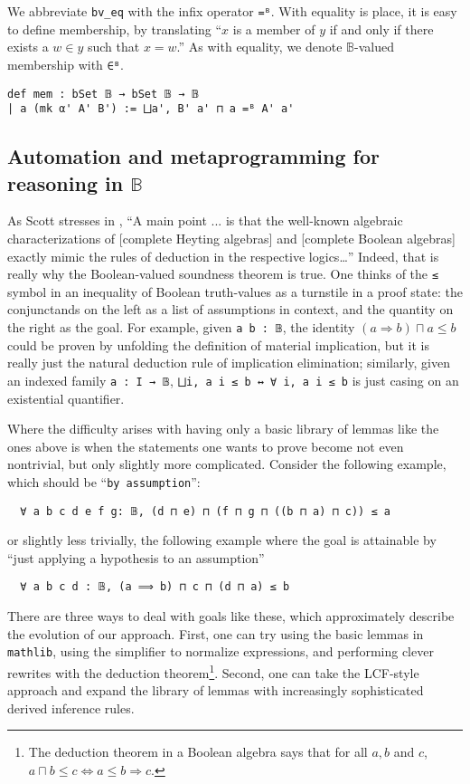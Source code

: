 \documentclass[a4paper,USenglish,cleveref, autoref]{lipics-v2019}
\newcommand{\B}{\mathbb{B}}
\newcommand{\lil}{\lstinline}
\theoremstyle{definition}
\begin{document}
We abbreviate \lil{bv_eq} with the infix operator \lil{=ᴮ}. With equality is place, it is easy to define membership, by translating ``$x$ is a member of $y$ if and only if there exists a $w \in y$ such that $x = w$.'' As with equality, we denote $\B$-valued membership with \lil{∈ᴮ}.
             
\begin{lstlisting}
def mem : bSet 𝔹 → bSet 𝔹 → 𝔹
| a (mk α' A' B') := ⨆a', B' a' ⊓ a =ᴮ A' a'
\end{lstlisting}

\subsection{Automation and metaprogramming for reasoning in $\B$} \label{subsect:proof-language}
As Scott stresses in \cite{scott3}, ``A main point ... is that the well-known algebraic characterizations of [complete Heyting algebras] and [complete Boolean algebras] exactly mimic the rules of deduction in the respective logics\ldots{}'' Indeed, that is really why the Boolean-valued soundness theorem is true. One thinks of the \lil{≤} symbol in an inequality of Boolean truth-values as a turnstile in a proof state: the conjunctands on the left as a list of assumptions in context, and the quantity on the right as the goal. For example, given \lil{a b : 𝔹}, the identity $(a \Rightarrow b) \sqcap a \leq b$ could be proven by unfolding the definition of material implication, but it is really just the natural deduction rule of implication elimination; similarly, given an indexed family \lil{a : I → 𝔹}, \lstinline{⨆i, a i ≤ b ↔ ∀ i, a i ≤ b} is just casing on an existential quantifier.

Where the difficulty arises with having only a basic library of lemmas like the ones above is when the statements one wants to prove become not even nontrivial, but only slightly more complicated. Consider the following example, which should be  ``\lil{by assumption}'':
\begin{lstlisting}
  ∀ a b c d e f g: 𝔹, (d ⊓ e) ⊓ (f ⊓ g ⊓ ((b ⊓ a) ⊓ c)) ≤ a
\end{lstlisting}
or slightly less trivially, the following example where the goal is attainable by ``just applying a hypothesis to an assumption''
\begin{lstlisting}
  ∀ a b c d : 𝔹, (a ⟹ b) ⊓ c ⊓ (d ⊓ a) ≤ b
\end{lstlisting}

There are three ways to deal with goals like these, which approximately describe the evolution of our approach. First, one can try using the basic lemmas in \lil{mathlib}, using the simplifier to normalize expressions, and performing clever rewrites with the deduction theorem\footnote{The deduction theorem in a Boolean algebra says that for all $a, b$ and $c$, $a \sqcap b \leq c \iff a \leq b \Rightarrow c$.}. Second, one can take the LCF-style approach and expand the library of lemmas with increasingly sophisticated derived inference rules.
\end{document}
